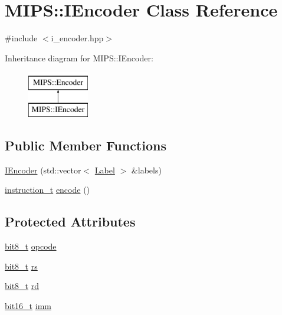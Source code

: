 \hypertarget{classMIPS_1_1IEncoder}{}\section{M\+I\+PS\+:\+:I\+Encoder Class Reference}
\label{classMIPS_1_1IEncoder}


{\ttfamily \#include $<$i\+\_\+encoder.\+hpp$>$}

Inheritance diagram for M\+I\+PS\+:\+:I\+Encoder\+:\begin{figure}[H]
\begin{center}
\leavevmode
\includegraphics[height=2.000000cm]{classMIPS_1_1IEncoder}
\end{center}
\end{figure}
\subsection*{Public Member Functions}
\begin{DoxyCompactItemize}
\item 
\hyperlink{classMIPS_1_1IEncoder_ad679cdf5f411cc280f2082b5f9967680}{I\+Encoder} (std\+::vector$<$ \hyperlink{structMIPS_1_1Label}{Label} $>$ \&labels)
\item 
\hyperlink{core_8hpp_aa514fd240a0e29abb2a2e4c805d7f1a4}{instruction\+\_\+t} \hyperlink{classMIPS_1_1IEncoder_abbfe598568fa0346b5acff6289636411}{encode} ()
\end{DoxyCompactItemize}
\subsection*{Protected Attributes}
\begin{DoxyCompactItemize}
\item 
\hyperlink{core_8hpp_a6074bae122ae7b527864eec42c728c3c}{bit8\+\_\+t} \hyperlink{classMIPS_1_1IEncoder_aaee35afc61eabac20e903e143397421b}{opcode}
\item 
\hyperlink{core_8hpp_a6074bae122ae7b527864eec42c728c3c}{bit8\+\_\+t} \hyperlink{classMIPS_1_1IEncoder_a0459966a1a63c56ad414f5f177eced99}{rs}
\item 
\hyperlink{core_8hpp_a6074bae122ae7b527864eec42c728c3c}{bit8\+\_\+t} \hyperlink{classMIPS_1_1IEncoder_a557c518ccc256d518b393f844ff12c29}{rd}
\item 
\hyperlink{core_8hpp_adc265a970bc35995b5879784bbb3f1b7}{bit16\+\_\+t} \hyperlink{classMIPS_1_1IEncoder_a69e9dd8e8b2161dd1dd2a47ff029b097}{imm}
\end{DoxyCompactItemize}
